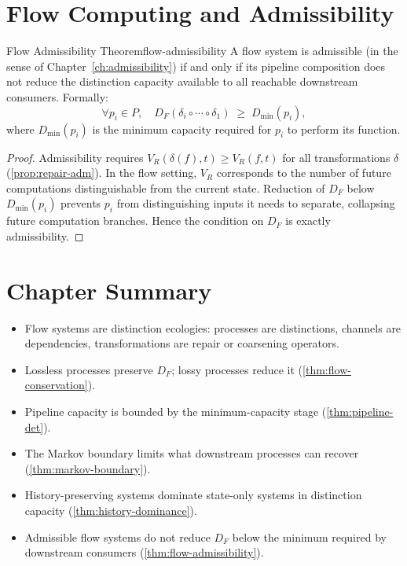 \documentclass[12pt,twoside,openright]{book}
\newenvironment{chapsummary}{%
  \begin{tcolorbox}[colback=DistBlue!5,colframe=DistBlue,
    title={\faBookOpen\enspace Summary},
    fonttitle=\sffamily\bfseries\color{white},
    attach boxed title to top left={yshift=-2mm,xshift=4mm},
    boxed title style={colback=DistBlue,rounded corners}]
  \begin{itemize}[nosep,leftmargin=*]}{%
  \end{itemize}\end{tcolorbox}}
\begin{document}
\section{Flow Computing and Admissibility}

\begin{theorem}{Flow Admissibility Theorem}{flow-admissibility}
  A flow system is admissible (in the sense of
  Chapter~\ref{ch:admissibility}) if and only if its
  pipeline composition does not reduce the distinction
  capacity available to all reachable downstream consumers.
  Formally:
  \[
    \forall p_i \in P,\quad
    D_F(\delta_i \circ \cdots \circ \delta_1)
    \;\ge\;
    D_{\min}(p_i),
  \]
  where $D_{\min}(p_i)$ is the minimum capacity
  required for $p_i$ to perform its function.
\end{theorem}

\begin{proof}
  Admissibility requires $V_R(\delta(f), t) \ge V_R(f, t)$
  for all transformations $\delta$
  (\cref{prop:repair-adm}).
  In the flow setting, $V_R$ corresponds to the number of
  future computations distinguishable from the current
  state. Reduction of $D_F$ below $D_{\min}(p_i)$
  prevents $p_i$ from distinguishing inputs it needs to
  separate, collapsing future computation branches.
  Hence the condition on $D_F$ is exactly admissibility.
\end{proof}

\section*{Chapter Summary}
\begin{chapsummary}
  \item Flow systems are distinction ecologies: processes
        are distinctions, channels are dependencies,
        transformations are repair or coarsening operators.
  \item Lossless processes preserve $D_F$; lossy processes
        reduce it (\cref{thm:flow-conservation}).
  \item Pipeline capacity is bounded by the minimum-capacity
        stage (\cref{thm:pipeline-det}).
  \item The Markov boundary limits what downstream
        processes can recover
        (\cref{thm:markov-boundary}).
  \item History-preserving systems dominate state-only
        systems in distinction capacity
        (\cref{thm:history-dominance}).
  \item Admissible flow systems do not reduce $D_F$ below
        the minimum required by downstream consumers
        (\cref{thm:flow-admissibility}).
\end{chapsummary}
\end{document}
